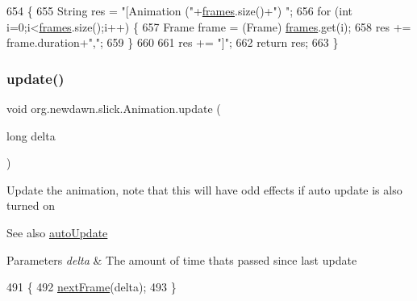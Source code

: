 \begin{DoxyCode}
654                              \{
655         String res = \textcolor{stringliteral}{"[Animation ("}+\mbox{\hyperlink{classorg_1_1newdawn_1_1slick_1_1_animation_a39f0c6a16e479985b22f7dd3bb781bf7}{frames}}.size()+\textcolor{stringliteral}{") "};
656         \textcolor{keywordflow}{for} (\textcolor{keywordtype}{int} i=0;i<\mbox{\hyperlink{classorg_1_1newdawn_1_1slick_1_1_animation_a39f0c6a16e479985b22f7dd3bb781bf7}{frames}}.size();i++) \{
657             Frame frame = (Frame) \mbox{\hyperlink{classorg_1_1newdawn_1_1slick_1_1_animation_a39f0c6a16e479985b22f7dd3bb781bf7}{frames}}.get(i);
658             res += frame.duration+\textcolor{stringliteral}{","};
659         \}
660         
661         res += \textcolor{stringliteral}{"]"};
662         \textcolor{keywordflow}{return} res;
663     \}
\end{DoxyCode}
\mbox{\label{classorg_1_1newdawn_1_1slick_1_1_animation_a24420dcd4e89ff617ed52a265e014ba5}} 
\subsubsection{\texorpdfstring{update()}{update()}}
{\footnotesize\ttfamily void org.\+newdawn.\+slick.\+Animation.\+update (\begin{DoxyParamCaption}\item[{long}]{delta }\end{DoxyParamCaption})\hspace{0.3cm}{\ttfamily [inline]}}

Update the animation, note that this will have odd effects if auto update is also turned on

\begin{DoxySeeAlso}{See also}
\mbox{\hyperlink{classorg_1_1newdawn_1_1slick_1_1_animation_a343dbff14a050cf8753e9a67746deede}{auto\+Update}} 
\end{DoxySeeAlso}

\begin{DoxyParams}{Parameters}
{\em delta} & The amount of time thats passed since last update \\
\hline
\end{DoxyParams}

\begin{DoxyCode}
491                                    \{
492         \mbox{\hyperlink{classorg_1_1newdawn_1_1slick_1_1_animation_ae23662cd09dfe23e566c45b9bf85d97a}{nextFrame}}(delta);
493     \}
\end{DoxyCode}
\mbox{\label{classorg_1_1newdawn_1_1slick_1_1_animation_a3796e0478490ad66b899fb94f19e0898}} 
